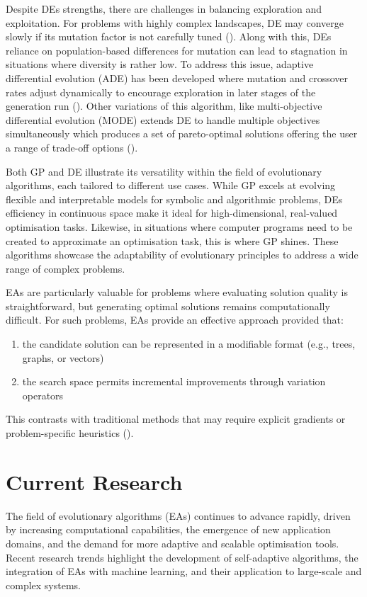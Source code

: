 \parbreak\noindent Despite DEs strengths, there are challenges in balancing exploration and exploitation. For problems with highly complex landscapes, DE may converge slowly if its mutation factor is not carefully tuned (\cite{das2010differential}). Along with this, DEs reliance on population-based differences for mutation can lead to stagnation in situations where diversity is rather low. To address this issue, adaptive differential evolution (ADE) has been developed where mutation and crossover rates adjust dynamically to encourage exploration in later stages of the generation run (\cite{das2010differential}). Other variations of this algorithm, like multi-objective differential evolution (MODE) extends DE to handle multiple objectives simultaneously which produces a set of pareto-optimal solutions offering the user a range of trade-off options (\cite{xue2003pareto}).

\parbreak\noindent Both GP and DE illustrate its versatility within the field of evolutionary algorithms, each tailored to different use cases. While GP excels at evolving flexible and interpretable models for symbolic and algorithmic problems, DEs efficiency in continuous space make it ideal for high-dimensional, real-valued optimisation tasks. Likewise, in situations where computer programs need to be created to approximate an optimisation task, this is where GP shines. These algorithms showcase the adaptability of evolutionary principles to address a wide range of complex problems.

\parbreak\noindent EAs are particularly valuable for problems where evaluating solution quality is straightforward, but generating optimal solutions remains computationally difficult. For such problems, EAs provide an effective approach provided that:
\begin{enumerate}
	\item the candidate solution can be represented in a modifiable format (e.g., trees, graphs, or vectors)
	\item the search space permits incremental improvements through variation operators
\end{enumerate}

\noindent This contrasts with traditional methods that may require explicit gradients or problem-specific heuristics (\cite{intelligentOptimization}).


\section{Current Research}\label{sec:ea_current_research}
The field of evolutionary algorithms (EAs) continues to advance rapidly, driven by increasing computational capabilities, the emergence of new application domains, and the demand for more adaptive and scalable optimisation tools. Recent research trends highlight the development  of self-adaptive algorithms, the integration of EAs with machine learning, and their application to large-scale and complex systems.

